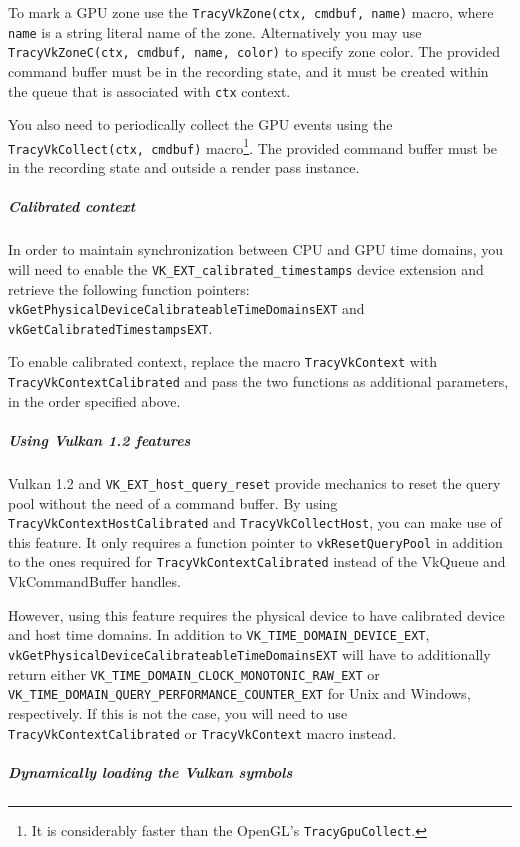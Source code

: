 \documentclass[hidelinks,titlepage,a4paper,twoside]{article}
\begin{document}
To mark a GPU zone use the \texttt{TracyVkZone(ctx, cmdbuf, name)} macro, where \texttt{name} is a string literal name of the zone. Alternatively you may use \texttt{TracyVkZoneC(ctx, cmdbuf, name, color)} to specify zone color. The provided command buffer must be in the recording state, and it must be created within the queue that is associated with \texttt{ctx} context.

You also need to periodically collect the GPU events using the \texttt{TracyVkCollect(ctx, cmdbuf)} macro\footnote{It is considerably faster than the OpenGL's \texttt{TracyGpuCollect}.}. The provided command buffer must be in the recording state and outside a render pass instance.

\subparagraph{Calibrated context}

In order to maintain synchronization between CPU and GPU time domains, you will need to enable the \texttt{VK\_EXT\_calibrated\_timestamps} device extension and retrieve the following function pointers: \texttt{vkGetPhysicalDeviceCalibrateableTimeDomainsEXT} and \texttt{vkGetCalibratedTimestampsEXT}.

To enable calibrated context, replace the macro \texttt{TracyVkContext} with \texttt{TracyVkContextCalibrated} and pass the two functions as additional parameters, in the order specified above.

\subparagraph{Using Vulkan 1.2 features}

Vulkan 1.2 and \texttt{VK\_EXT\_host\_query\_reset} provide mechanics to reset the query pool without the need of a command buffer. By using \texttt{TracyVkContextHostCalibrated} and \texttt{TracyVkCollectHost}, you can make use of this feature. It only requires a function pointer to \texttt{vkResetQueryPool} in addition to the ones required for \texttt{TracyVkContextCalibrated} instead of the VkQueue and VkCommandBuffer handles.

However, using this feature requires the physical device to have calibrated device and host time domains. In addition to \texttt{VK\_TIME\_DOMAIN\_DEVICE\_EXT}, \texttt{vkGetPhysicalDeviceCalibrateableTimeDomainsEXT} will have to additionally return either \texttt{VK\_TIME\_DOMAIN\_CLOCK\_MONOTONIC\_RAW\_EXT} or \texttt{VK\_TIME\_DOMAIN\_QUERY\_PERFORMANCE\_COUNTER\_EXT} for Unix and Windows, respectively. If this is not the case, you will need to use \texttt{TracyVkContextCalibrated} or \texttt{TracyVkContext} macro instead.

\subparagraph{Dynamically loading the Vulkan symbols}
\end{document}
